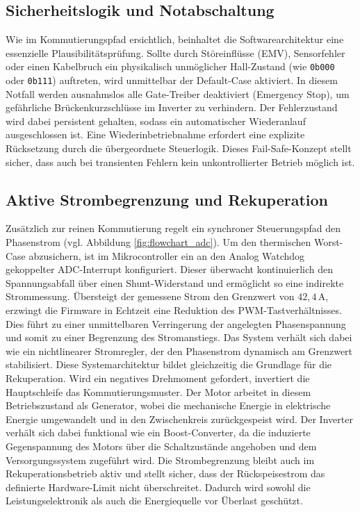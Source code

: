 \subsection{Sicherheitslogik und Notabschaltung}
Wie im Kommutierungspfad ersichtlich, beinhaltet die Softwarearchitektur eine essenzielle Plausibilitätsprüfung. Sollte durch Störeinflüsse (EMV), Sensorfehler oder einen Kabelbruch ein physikalisch unmöglicher Hall-Zustand (wie \texttt{0b000} oder \texttt{0b111}) auftreten, wird unmittelbar der Default-Case aktiviert.
In diesem Notfall werden ausnahmslos alle Gate-Treiber deaktiviert (Emergency Stop), um gefährliche Brückenkurzschlüsse im Inverter zu verhindern. Der Fehlerzustand wird dabei persistent gehalten, sodass ein automatischer Wiederanlauf ausgeschlossen ist. Eine Wiederinbetriebnahme erfordert eine explizite Rücksetzung durch die übergeordnete Steuerlogik. Dieses Fail-Safe-Konzept stellt sicher, dass auch bei transienten Fehlern kein unkontrollierter Betrieb möglich ist.

\subsection{Aktive Strombegrenzung und Rekuperation}
Zusätzlich zur reinen Kommutierung regelt ein synchroner Steuerungspfad den Phasenstrom (vgl. Abbildung \ref{fig:flowchart_adc}). Um den thermischen Worst-Case abzusichern, ist im Mikrocontroller ein an den Analog Watchdog gekoppelter ADC-Interrupt konfiguriert. Dieser überwacht kontinuierlich den Spannungsabfall über einen Shunt-Widerstand und ermöglicht so eine indirekte Strommessung.
Übersteigt der gemessene Strom den Grenzwert von $42{,}4\,\mathrm{A}$, erzwingt die Firmware in Echtzeit eine Reduktion des PWM-Tastverhältnisses. Dies führt zu einer unmittelbaren Verringerung der angelegten Phasenspannung und somit zu einer Begrenzung des Stromanstiegs. Das System verhält sich dabei wie ein nichtlinearer Stromregler, der den Phasenstrom dynamisch am Grenzwert stabilisiert.
Diese Systemarchitektur bildet gleichzeitig die Grundlage für die Rekuperation. Wird ein negatives Drehmoment gefordert, invertiert die Hauptschleife das Kommutierungsmuster. Der Motor arbeitet in diesem Betriebszustand als Generator, wobei die mechanische Energie in elektrische Energie umgewandelt und in den Zwischenkreis zurückgespeist wird. Der Inverter verhält sich dabei funktional wie ein Boost-Converter, da die induzierte Gegenspannung des Motors über die Schaltzustände angehoben und dem Versorgungssystem zugeführt wird.
Die Strombegrenzung bleibt auch im Rekuperationsbetrieb aktiv und stellt sicher, dass der Rückspeisestrom das definierte Hardware-Limit nicht überschreitet. Dadurch wird sowohl die Leistungselektronik als auch die Energiequelle vor Überlast geschützt.